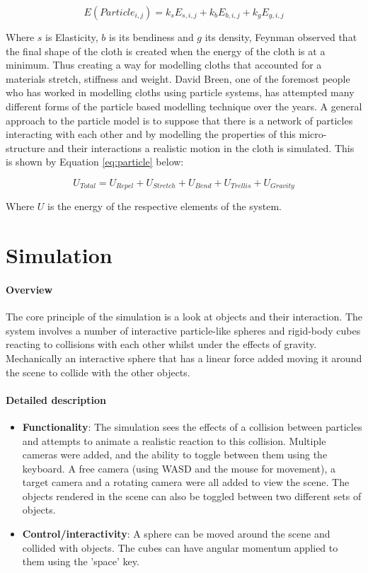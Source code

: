 \documentclass[conference,backref=page]{acmsiggraph}
\begin{document}
\begin{equation} \label{eq:physical}
	E(Particle_{i,j}) = k_{s}E_{s,i,j} + k_{b}E_{b,i,j} + k_{g}E_{g,i,j}
\end{equation}

Where $s$ is Elasticity, $b$ is its bendiness and $g$ its density, Feynman observed that the final shape of the cloth is created when the energy of the cloth is at a minimum. Thus creating a way for modelling cloths that accounted for a materials stretch, stiffness and weight. David Breen, one of the foremost people who has worked in modelling cloths using particle systems, has attempted many different forms of the particle based modelling technique over the years. A general approach to the particle model is to suppose that there is a network of particles interacting with each other and by modelling the properties of this micro-structure and their interactions a realistic motion in the cloth is simulated. This is shown by Equation \ref{eq:particle} below:

\begin{equation} \label{eq:particle}
U_{Total} = U_{Repel} + U_{Stretch} + U_{Bend} + U_{Trellis} + U_{Gravity}
\end{equation}

Where $U$ is the energy of the respective elements of the system.

\section{Simulation}

\paragraph{Overview}
The core principle of the simulation is a look at objects and their interaction. The system involves a number of interactive particle-like spheres and rigid-body cubes reacting to collisions with each other whilst under the effects of gravity. Mechanically an interactive sphere that has a linear force added moving it around the scene to collide with the other objects.

\paragraph{Detailed description}
\begin{itemize}
\item {\bf Functionality}: The simulation sees the effects of a collision between particles and attempts to animate a realistic reaction to this collision. Multiple cameras were added, and the ability to toggle between them using the keyboard. A free camera (using WASD and the mouse for movement), a target camera and a rotating camera were all added to view the scene. The objects rendered in the scene can also be toggled between two different sets of objects.
\item {\bf Control/interactivity}: A sphere can be moved around the scene and collided with objects. The cubes can have angular momentum applied to them using the 'space' key.
\end{itemize}
\end{document}
